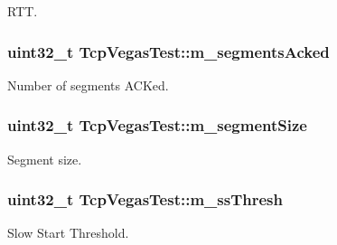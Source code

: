 R\+TT. 

\subsubsection[{\texorpdfstring{m\+\_\+segments\+Acked}{m_segmentsAcked}}]{\setlength{\rightskip}{0pt plus 5cm}uint32\+\_\+t Tcp\+Vegas\+Test\+::m\+\_\+segments\+Acked\hspace{0.3cm}{\ttfamily [private]}}\hypertarget{classTcpVegasTest_af429efbb9af0e86883c30c8177e1ee0e}{}\label{classTcpVegasTest_af429efbb9af0e86883c30c8177e1ee0e}


Number of segments A\+C\+Ked. 

\subsubsection[{\texorpdfstring{m\+\_\+segment\+Size}{m_segmentSize}}]{\setlength{\rightskip}{0pt plus 5cm}uint32\+\_\+t Tcp\+Vegas\+Test\+::m\+\_\+segment\+Size\hspace{0.3cm}{\ttfamily [private]}}\hypertarget{classTcpVegasTest_a93c5780c0af6cdfa7af29c0a5688ca0a}{}\label{classTcpVegasTest_a93c5780c0af6cdfa7af29c0a5688ca0a}


Segment size. 

\subsubsection[{\texorpdfstring{m\+\_\+ss\+Thresh}{m_ssThresh}}]{\setlength{\rightskip}{0pt plus 5cm}uint32\+\_\+t Tcp\+Vegas\+Test\+::m\+\_\+ss\+Thresh\hspace{0.3cm}{\ttfamily [private]}}\hypertarget{classTcpVegasTest_afee1db7a63768ef7cbf6641f2235c263}{}\label{classTcpVegasTest_afee1db7a63768ef7cbf6641f2235c263}


Slow Start Threshold. 

